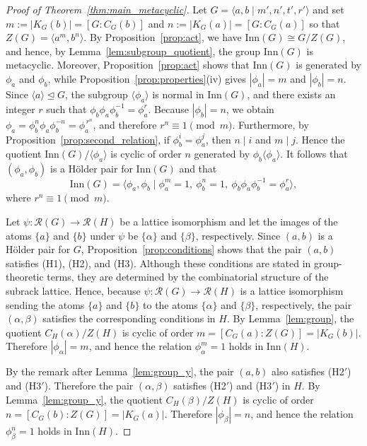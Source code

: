 \documentclass[a4paper,12pt]{article}
\theoremstyle{definition}
\theoremstyle{remark}
\begin{document}
\begin{proof}[Proof of Theorem~\ref{thm:main_metacyclic}]
  Let $G = \langle a,b\mid m',n',t',r'\rangle$ and set $m:=|K_G(b)|=[G:C_G(b)]$ and $n:=|K_G(a)|=[G:C_G(a)]$ so that $Z(G) = \langle a^m,b^n\rangle$. By Proposition~\ref{prop:act}, we have $\mathrm{Inn}(G)\cong G/Z(G)$, and hence, by Lemma~\ref{lem:subgroup_quotient}, the group $\mathrm{Inn}(G)$ is metacyclic. Moreover, Proposition~\ref{prop:act} shows that $\mathrm{Inn}(G)$ is generated by $\phi_a$ and $\phi_b$, while Proposition~\ref{prop:properties}(iv) gives $|\phi_a|=m$ and $|\phi_b|=n$. Since $\langle a\rangle\trianglelefteq G$, the subgroup $\langle \phi_a\rangle$ is normal in $\mathrm{Inn}(G)$, and there exists an integer $r$ such that $\phi_b\phi_a\phi_b^{-1}=\phi_a^r$. Because $|\phi_b|=n$, we obtain $\phi_a=\phi_b^n\phi_a\phi_b^{-n}=\phi_a^{\,r^n}$, and therefore $r^n\equiv 1 \pmod{m}$. Furthermore, by Proposition~\ref{prop:second_relation}, if $\phi_b^i=\phi_a^j$, then $n\mid i$ and $m\mid j$. Hence the quotient $\mathrm{Inn}(G)/\langle \phi_a\rangle$ is cyclic of order $n$ generated by $\phi_b\langle \phi_a\rangle$. It follows that $(\phi_a,\phi_b)$ is a Hölder pair for $\mathrm{Inn}(G)$ and that
  $$ \mathrm{Inn}(G) = \langle \phi_a,\phi_b \mid \phi_a^m=1,\ \phi_b^n=1,\ \phi_b\phi_a\phi_b^{-1}=\phi_a^r\rangle, $$
  where $r^n\equiv 1\pmod{m}$.
  
  Let $\psi\colon \mathcal{R}(G)\to \mathcal{R}(H)$ be a lattice isomorphism and let the images of the atoms $\{a\}$ and $\{b\}$ under $\psi$ be $\{\alpha\}$ and $\{\beta\}$, respectively. Since $(a,b)$ is a Hölder pair for $G$, Proposition~\ref{prop:conditions} shows that the pair $(a,b)$ satisfies (H1), (H2), and (H3). Although these conditions are stated in group-theoretic terms, they are determined by the combinatorial structure of the subrack lattice. Hence, because $\psi\colon \mathcal{R}(G)\longrightarrow \mathcal{R}(H)$ is a lattice isomorphism sending the atoms $\{a\}$ and $\{b\}$ to the atoms $\{\alpha\}$ and $\{\beta\}$, respectively, the pair $(\alpha,\beta)$ satisfies the corresponding conditions in $H$. By Lemma~\ref{lem:group}, the quotient $C_H(\alpha)/Z(H)$ is cyclic of order $m=[C_G(a):Z(G)]=|K_G(b)|$. Therefore $|\phi_\alpha|=m$, and hence the relation  $\phi_\alpha^m=1$ holds in $\mathrm{Inn}(H)$.

  By the remark after Lemma~\ref{lem:group_y}, the pair $(a,b)$ also satisfies (H2$'$) and (H3$'$). Therefore the pair $(\alpha,\beta)$ satisfies (H2$'$) and (H3$'$) in $H$. By Lemma~\ref{lem:group_y}, the quotient $C_H(\beta)/Z(H)$ is cyclic of order $n=[C_G(b):Z(G)]=|K_G(a)|$. Therefore $|\phi_\beta|=n$, and hence the relation $\phi_\beta^n=1$ holds in $\mathrm{Inn}(H)$.


\end{proof}
\end{document}
